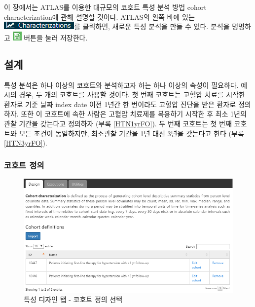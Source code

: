 \documentclass[10.5pt]{book}
\theoremstyle{definition}
\theoremstyle{definition}
\theoremstyle{definition}
\theoremstyle{remark}
\begin{document}
이 장에서는 ATLAS를 이용한 대규모의 코호트 특성 분석 방법 cohort
characterization에 관해 설명할 것이다. ATLAS의 왼쪽 바에 있는
\includegraphics{images/Characterization/atlasCharacterizationMenuItem.png}를
클릭하면, 새로운 특성 분석을 만들 수 있다. 분석을 명명하고
\includegraphics{images/PopulationLevelEstimation/save.png} 버튼을 눌러
저장한다.

\subsection{설계}

특성 분석은 하나 이상의 코호트와 분석하고자 하는 하나 이상의 속성이
필요하다. 예시의 경우, 두 개의 코호트를 사용할 것이다. 첫 번째 코호트는
고혈압 치료를 시작한 환자로 기준 날짜 index date 이전 1년간 한 번이라도
고혈압 진단을 받은 환자로 정의하자. 또한 이 코호트에 속한 사람은 고혈압
치료제를 복용하기 시작한 후 최소 1년의 관찰 기간을 갖는다고 정의하자
(부록 \ref{HTN1yrFO}). 두 번째 코호트는 첫 번째 코호트와 모든 조건이
동일하지만, 최소관찰 기간을 1년 대신 3년을 갖는다고 한다 (부록
\ref{HTN3yrFO}).

\subsubsection*{코호트 정의}\label{-}

\begin{figure}

{\centering \includegraphics[width=1\linewidth]{images/Characterization/atlasCharacterizationCohortSelection} 

}

\caption{특성 디자인 탭 - 코호트 정의 선택}\label{fig:atlasCharacterizationCohortSelection}
\end{figure}
\end{document}
